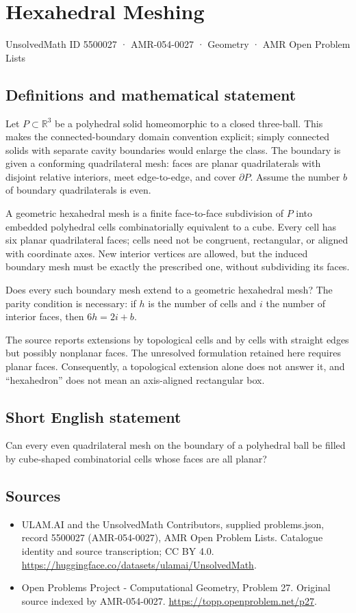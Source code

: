 \documentclass[11pt,a4paper]{article}
\begin{document}
\section*{Hexahedral Meshing}\label{5500027}
{\small UnsolvedMath ID 5500027 · AMR-054-0027 · Geometry · AMR Open Problem Lists}
\subsection{Definitions and mathematical statement}
Let $P\subset\mathbb R^3$ be a polyhedral solid homeomorphic to a closed
three-ball. This makes the connected-boundary domain convention explicit;
simply connected solids with separate cavity boundaries would enlarge
the class. The boundary is given a conforming quadrilateral mesh: faces
are planar quadrilaterals with disjoint relative interiors, meet
edge-to-edge, and cover $\partial P$. Assume the number $b$ of boundary
quadrilaterals is even.

A geometric hexahedral mesh is a finite face-to-face subdivision of
$P$ into embedded polyhedral cells combinatorially equivalent to a
cube. Every cell has six planar quadrilateral faces; cells need not
be congruent, rectangular, or aligned with coordinate axes. New
interior vertices are allowed, but the induced boundary mesh must be
exactly the prescribed one, without subdividing its faces.

Does every such boundary mesh extend to a geometric hexahedral mesh?
The parity condition is necessary: if $h$ is the number of cells and
$i$ the number of interior faces, then $6h=2i+b$.

The source reports extensions by topological cells and by cells with
straight edges but possibly nonplanar faces. The unresolved formulation
retained here requires planar faces. Consequently, a topological
extension alone does not answer it, and ``hexahedron'' does not mean
an axis-aligned rectangular box.
\subsection{Short English statement}
Can every even quadrilateral mesh on the boundary of a polyhedral ball
be filled by cube-shaped combinatorial cells whose faces are all planar?
\subsection{Sources}
\begin{itemize}
\item[S1] ULAM.AI and the UnsolvedMath Contributors, supplied problems.json, record 5500027 (AMR-054-0027), AMR Open Problem Lists. Catalogue identity and source transcription; CC BY 4.0.
\url{https://huggingface.co/datasets/ulamai/UnsolvedMath}.
\item[S2] Open Problems Project - Computational Geometry, Problem 27. Original source indexed by AMR-054-0027.
\url{https://topp.openproblem.net/p27}.
\end{itemize}
\end{document}
